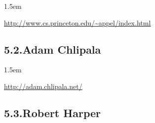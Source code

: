 \documentclass[12pt,twoside]{article}
\begin{document}
\begin{mddefinitions}%


\begin{mdbmarginx}{}{}{}{1.5em}%
\begin{mddefdata}%
\href{http://www.cs.princeton.edu/~appel/index.html}{{\ttfamily http://\hspace{0pt}www.\hspace{0pt}cs.\hspace{0pt}princeton.\hspace{0pt}edu/\hspace{0pt}\textasciitilde{}appel/\hspace{0pt}index.\hspace{0pt}html}}%
\end{mddefdata}%
\end{mdbmarginx}%
\end{mddefinitions}%

\subsection{5.2.\hspace*{0.5em}Adam Chlipala}%

\begin{mddefinitions}%


\begin{mdbmarginx}{}{}{}{1.5em}%
\begin{mddefdata}%
\href{http://adam.chlipala.net/}{{\ttfamily http://\hspace{0pt}adam.\hspace{0pt}chlipala.\hspace{0pt}net/\hspace{0pt}}}%
\end{mddefdata}%
\end{mdbmarginx}%
\end{mddefinitions}%

\subsection{5.3.\hspace*{0.5em}Robert Harper}%
\end{document}

